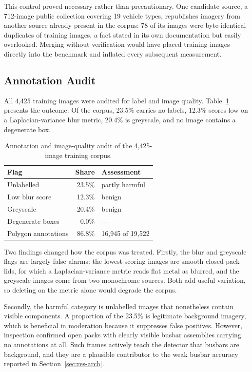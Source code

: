 This control proved necessary rather than precautionary. One candidate source, a
712-image public collection covering 19 vehicle types, republishes imagery from
another source already present in the corpus: 78 of its images were
byte-identical duplicates of training images, a fact stated in its own
documentation but easily overlooked. Merging without verification would have
placed training images directly into the benchmark and inflated every subsequent
measurement.

\subsection{Annotation Audit}
\label{sec:audit}

\noindent All 4,425 training images were audited for label and image quality.
Table~\ref{tab:audit} presents the outcome. Of the corpus, 23.5\% carries no
labels, 12.3\% scores low on a Laplacian-variance blur metric, 20.4\% is
greyscale, and no image contains a degenerate box.

\begin{table}[t]
\caption{Annotation and image-quality audit of the 4,425-image training corpus.}
\label{tab:audit}
\centering\small
\setlength{\tabcolsep}{3.5pt}
\begin{tabular}{lrl}
\hline
Flag & Share & Assessment \\
\hline
Unlabelled & 23.5\% & partly harmful \\
Low blur score & 12.3\% & benign \\
Greyscale & 20.4\% & benign \\
Degenerate boxes & 0.0\% & --- \\
\hline
Polygon annotations & 86.8\% & 16,945 of 19,522 \\
\hline
\end{tabular}
\end{table}

Two findings changed how the corpus was treated. Firstly, the blur and greyscale flags
are largely false alarms: the lowest-scoring images are smooth closed pack lids, for
which a Laplacian-variance metric reads flat metal as blurred, and the greyscale images
come from two monochrome sources. Both add useful variation, so deleting on the metric
alone would degrade the corpus.

Secondly, the harmful category is unlabelled images that nonetheless contain
visible components. A proportion of the 23.5\% is legitimate background imagery,
which is beneficial in moderation because it suppresses false positives. However,
inspection confirmed open packs with clearly visible busbar assemblies carrying
no annotations at all. Such frames actively teach the detector that busbars are
background, and they are a plausible contributor to the weak busbar accuracy
reported in Section~\ref{sec:res-arch}.

